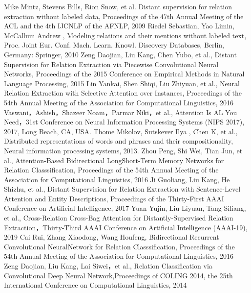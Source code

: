 \documentclass[UTF8]{csoarticle}
\begin{document}
\begin{thebibliography}{15}
     Mike Mintz, Stevens Bills, Rion Snow, et al. Distant supervision for relation extraction without labeled data, Proceedings of the 47th Annual Meeting of the ACL and the 4th IJCNLP of the AFNLP, 2009
     Riedel Sebastian, Yao Limin, McCallum Andrew , Modeling relations and their mentions without labeled text, Proc. Joint Eur. Conf. Mach. Learn. Knowl. Discovery Databases, Berlin, Germany: Springer, 2010
     Zeng Daojian, Liu Kang, Chen Yubo, et al., Distant Supervision for Relation Extraction via Piecewise Convolutional Neural Networks, Proceedings of the 2015 Conference on Empirical Methods in Natural Language Processing, 2015
     Lin Yankai, Shen Shiqi, Liu Zhiyuan, et al., Neural Relation Extraction with Selective Attention over Instances, Proceedings of the 54th Annual Meeting of the Association for Computational Linguistics, 2016
     Vaswani，Ashish，Shazeer Noam，Parmar Niki，et al., Attention Is AL You Need，31st Conference on Neural Information Processing Systems (NIPS 2017), 2017, Long Beach, CA, USA.
     Thome Mikolov, Sutskever Ilya , Chen K, et al., Distributed representations of words and phrases and their compositionality, Neural information processing systems, 2013.
     Zhou Peng, Shi Wei, Tian Jun, et al.,  Attention-Based Bidirectional LongShort-Term Memory Networks for Relation Classsification, Proceedings of the 54th Annual Meeting of the Association for Computational Linguistics, 2016
     Ji Guoliang, Liu Kang, He Shizhu, et al., Distant Supervision for Relation Extraction with Sentence-Level Attention and Entity Descriptions, Proceedings of the Thirty-First AAAI Conference on Artificial Intelligence, 2017
     Yuan Yujin, Liu Liyuan, Tang Siliang, et al., Cross-Relation Cross-Bag Attention for Distantly-Supervised Relation Extraction，Thirty-Third AAAI Conference on Artificial Intelligence (AAAI-19), 2019
     Cai Rui, Zhang Xiaodong, Wang Houfeng, Bidirectional Recurrent Convolutional NeuralNetwork for Relation Classsification, Proceedings of the 54th Annual Meeting of the Association for Computational Linguistics, 2016
     Zeng Daojian, Liu Kang, Lai Siwei，et al., Relation Classification via Convolutional Deep Neural Network,Proceedings of COLING 2014, the 25th International Conference on Computational Linguistics, 2014
\end{thebibliography}
\end{document}
